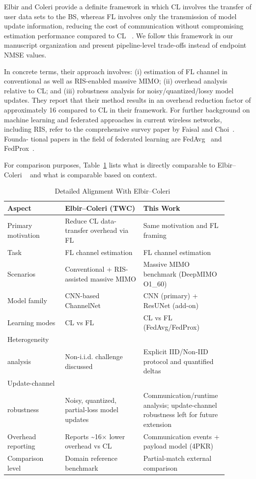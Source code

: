 \documentclass{llncs}
\begin{document}
Elbir and Coleri provide a definite framework in which CL involves the transfer of user data sets to the BS, whereas FL involves only the transmission of model update information, reducing the cost of communication without compromising estimation performance compared to CL ~\cite{elbir2021flchannel}. We follow this framework in our manuscript organization and present pipeline-level trade-offs instead of endpoint NMSE values.

In concrete terms, their approach involves: (i) estimation of FL channel in conventional as well as RIS-enabled massive MIMO; (ii) overhead analysis relative to CL; and (iii) robustness analysis for noisy/quantized/lossy model updates.
They report that their method results in an overhead reduction factor of approximately 16 compared to CL in their framework. For further background on machine learning and federated approaches in current wireless networks, including RIS, refer to the comprehensive survey paper by Faisal and Choi~\cite{faisal2022rismlsurvey}. Founda-
tional papers in the field of federated learning are FedAvg~\cite{mcmahan2017fedavg} and FedProx~\cite{li2020fedprox}.


For comparison purposes,  Table~\ref{tab:alignment_ec} lists what is directly comparable to
Elbir–Coleri ~\cite{elbir2021flchannel} and what is comparable based on context.

\begin{table}[htbp]
\caption{Detailed Alignment With Elbir--Coleri~\cite{elbir2021flchannel}}
\label{tab:alignment_ec}
\centering
\begin{tabular}{p{0.25\linewidth}p{0.34\linewidth}p{0.30\linewidth}}
\toprule
Aspect & Elbir--Coleri (TWC) & This Work \\
\midrule
Primary motivation & Reduce CL data-transfer overhead via FL & Same motivation and FL framing \\
Task & FL channel estimation & FL channel estimation \\
Scenarios & Conventional + RIS-assisted massive MIMO & Massive MIMO benchmark (DeepMIMO O1\_60) \\
Model family & CNN-based ChannelNet & CNN (primary) + ResUNet (add-on) \\
Learning modes & CL vs FL & CL vs FL (FedAvg/FedProx) \\
Heterogeneity \\ analysis & Non-i.i.d. challenge discussed & Explicit IID/Non-IID protocol and quantified deltas \\
Update-channel \\ robustness & Noisy, quantized, partial-loss model updates & Communication/runtime analysis; update-channel robustness left for future extension \\
Overhead reporting & Reports \textasciitilde16$\times$ lower overhead vs CL & Communication events + payload model (4PKR) \\
Comparison level & Domain reference benchmark & Partial-match external comparison \\
\bottomrule
\end{tabular}
\end{table}
\end{document}
